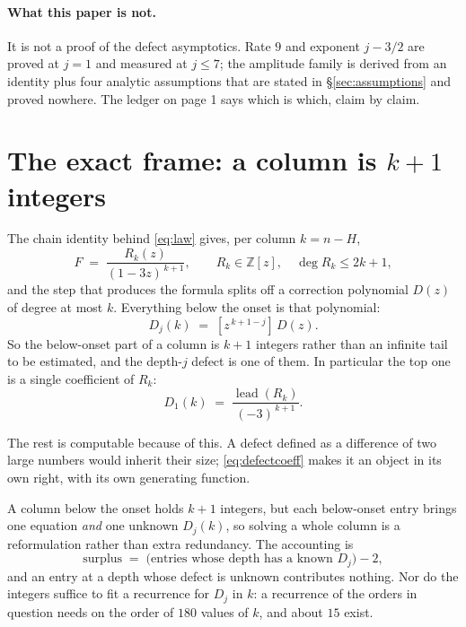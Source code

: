 \documentclass[11pt]{article}
\newcommand{\Z}{\mathbb{Z}}
\begin{document}
\paragraph{What this paper is not.} It is not a proof of the defect
asymptotics. Rate $9$ and exponent $j - 3/2$ are proved at $j = 1$ and measured
at $j \le 7$; the amplitude family is derived from an identity plus four
analytic assumptions that are stated in \S\ref{sec:assumptions} and proved
nowhere. The ledger on page 1 says which is which, claim by claim.

\section{The exact frame: a column is \texorpdfstring{$k+1$}{k+1} integers}
\label{sec:frame}

The chain identity behind \eqref{eq:law} gives, per column $k = n - H$,
\begin{equation}
  [y^k]F \;=\; \frac{R_k(z)}{(1-3z)^{\,k+1}}, \qquad R_k \in \Z[z], \quad
  \deg R_k \le 2k+1,
  \label{eq:column}
\end{equation}
and the step that produces the formula splits off a correction polynomial
$D(z)$ of degree at most $k$. Everything below the onset is that polynomial:
\begin{equation}
  D_j(k) \;=\; [z^{\,k+1-j}]\,D(z).
  \label{eq:defectcoeff}
\end{equation}
So the below-onset part of a column is $k+1$ integers rather than an infinite
tail to be estimated, and the depth-$j$ defect is one of them. In
particular the top one is a single coefficient of $R_k$:
\begin{equation}
  D_1(k) \;=\; \frac{\operatorname{lead}(R_k)}{(-3)^{\,k+1}}.
  \label{eq:d1lead}
\end{equation}

The rest is computable because of this. A defect defined as a difference of two
large numbers would inherit their size; \eqref{eq:defectcoeff} makes it an object
in its own right, with its own generating function.

\begin{remark}
A column below the onset holds $k+1$ integers, but each below-onset entry
brings one equation \emph{and} one unknown $D_j(k)$, so solving a whole column
is a reformulation rather than extra redundancy. The accounting is
\[
  \text{surplus} \;=\; \bigl(\text{entries whose depth has a known } D_j\bigr) - 2,
\]
and an entry at a depth whose defect is unknown contributes nothing. Nor do
the integers suffice to fit a recurrence for $D_j$ in $k$: a recurrence of the
orders in question needs on the order of $180$ values of $k$, and about $15$
exist.
\end{remark}
\end{document}
